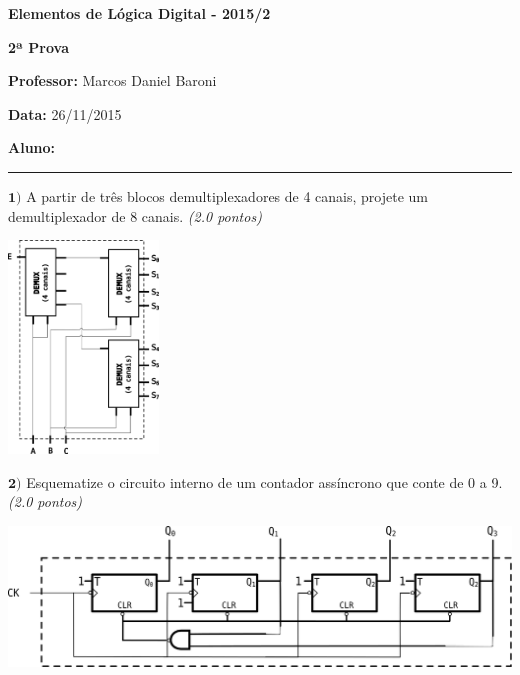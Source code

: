 \documentclass[12pt]{article}
\newcommand{\exerc}[3]{ \vspace*{25pt} {$\mathbf{#1)}$} #2 \hfill {\it #3} }
\begin{document}

\begin{center}
{\Large \bf Elementos de Lógica Digital - 2015/2}
\end{center}
\vspace{2pt}

{\large \bf 2ª Prova}

{\bf Professor:} Marcos Daniel Baroni

{\bf Data:} 26/11/2015

\vspace{2pt}
{\bf Aluno:} \rule[-2mm]{130mm}{1pt}

\exerc{1}{A partir de três blocos demultiplexadores de 4 canais, projete um
  demultiplexador de 8 canais.}{(2.0 pontos)}
  \begin{center}
    \includegraphics[width=40mm]{demux8}
  \end{center}

\vspace{-14pt}
\exerc{2}{Esquematize o circuito interno de um contador assíncrono que conte de 0 a 9.}{(2.0 pontos)}
\begin{center}
  \includegraphics[scale=0.8]{cont3} \\ \vspace{15pt}
\end{center}
\end{document}
